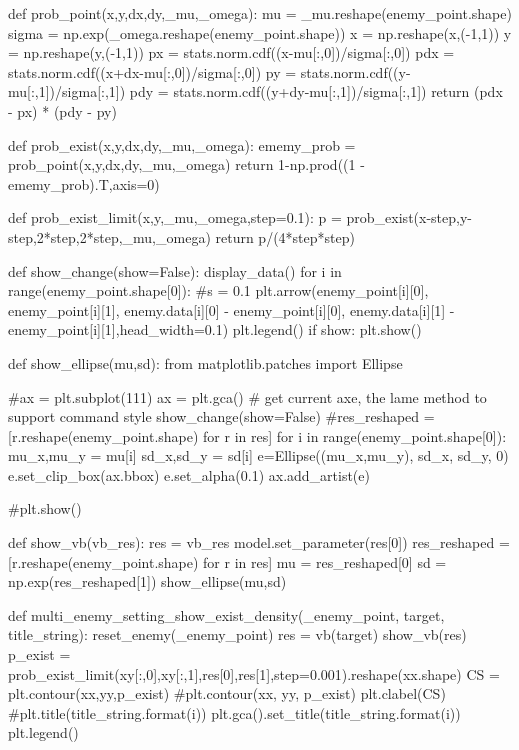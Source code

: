 \documentclass{sicnuthesis}
\begin{document}
\begin{python}

def prob_point(x,y,dx,dy,_mu,_omega):
    mu = _mu.reshape(enemy_point.shape)
    sigma = np.exp(_omega.reshape(enemy_point.shape))
    x = np.reshape(x,(-1,1))
    y = np.reshape(y,(-1,1))
    px  = stats.norm.cdf((x-mu[:,0])/sigma[:,0])
    pdx = stats.norm.cdf((x+dx-mu[:,0])/sigma[:,0])
    py  = stats.norm.cdf((y-mu[:,1])/sigma[:,1])
    pdy = stats.norm.cdf((y+dy-mu[:,1])/sigma[:,1])
    return (pdx - px) * (pdy - py)

def prob_exist(x,y,dx,dy,_mu,_omega):
    ememy_prob = prob_point(x,y,dx,dy,_mu,_omega)
    return 1-np.prod((1 - ememy_prob).T,axis=0) 

def prob_exist_limit(x,y,_mu,_omega,step=0.1):
    p = prob_exist(x-step,y-step,2*step,2*step,_mu,_omega)
    return p/(4*step*step)

def show_change(show=False):
    display_data()
    for i in range(enemy_point.shape[0]):
        #s = 0.1
        plt.arrow(enemy_point[i][0], enemy_point[i][1], enemy.data[i][0] - enemy_point[i][0], enemy.data[i][1] - enemy_point[i][1],head_width=0.1)
    plt.legend()
    if show:
        plt.show()


def show_ellipse(mu,sd):
    from matplotlib.patches import Ellipse
    
    #ax = plt.subplot(111)
    ax = plt.gca() # get current axe, the lame method to support command style
    show_change(show=False)
    #res_reshaped = [r.reshape(enemy_point.shape) for r in res]
    for i in range(enemy_point.shape[0]):
        mu_x,mu_y = mu[i]
        sd_x,sd_y = sd[i]
        e=Ellipse((mu_x,mu_y), sd_x, sd_y, 0)
        e.set_clip_box(ax.bbox)
        e.set_alpha(0.1)
        ax.add_artist(e)
        
    #plt.show()
    
    
def show_vb(vb_res):
    res = vb_res
    model.set_parameter(res[0])
    res_reshaped = [r.reshape(enemy_point.shape) for r in res]
    mu = res_reshaped[0]
    sd = np.exp(res_reshaped[1])
    show_ellipse(mu,sd)
    
def multi_enemy_setting_show_exist_density(_enemy_point, target, title_string):
    reset_enemy(_enemy_point)
    res = vb(target)
    show_vb(res)
    p_exist = prob_exist_limit(xy[:,0],xy[:,1],res[0],res[1],step=0.001).reshape(xx.shape)
    CS = plt.contour(xx,yy,p_exist)
    #plt.contour(xx, yy, p_exist)
    plt.clabel(CS)
    #plt.title(title_string.format(i))
    plt.gca().set_title(title_string.format(i))
    plt.legend()


\end{python}
\end{document}
